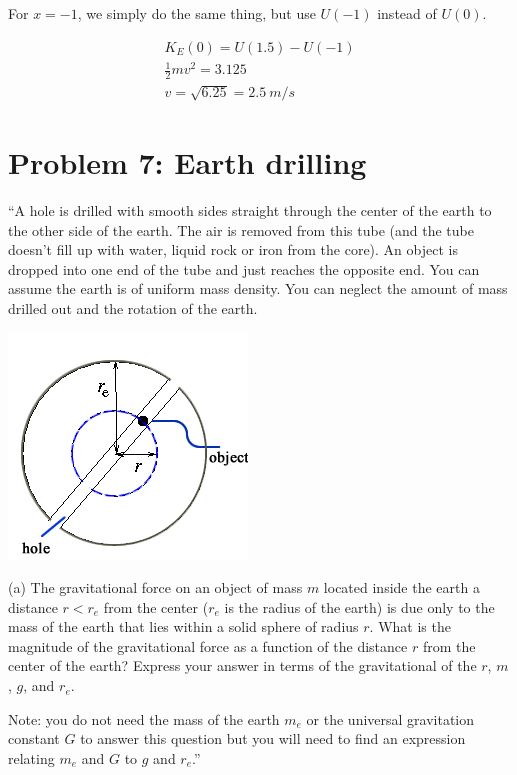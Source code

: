 \documentclass[12pt,a4paper]{report}
\begin{document}
For $x = -1$, we simply do the same thing, but use $U(-1)$ instead of $U(0)$.

\begin{align}
K_E(0) = U(1.5) - U(-1)\\
\frac{1}{2} m v^2 = 3.125\\
v = \sqrt{6.25} = \SI{2.5}{m/s}
\end{align}

\section{Problem 7: Earth drilling}

``A hole is drilled with smooth sides straight through the center of the earth to the other side of the earth. The air is removed from this tube (and the tube doesn't fill up with water, liquid rock or iron from the core). An object is dropped into one end of the tube and just reaches the opposite end. You can assume the earth is of uniform mass density. You can neglect the amount of mass drilled out and the rotation of the earth.

\begin{center}
\includegraphics[scale=0.75]{Graphics/h5p7}
\end{center}

(a) The gravitational force on an object of mass $m$ located inside the earth a distance $r < r_e$ from the center ($r_e$ is the radius of the earth) is due only to the mass of the earth that lies within a solid sphere of radius $r$. What is the magnitude of the gravitational force as a function of the distance $r$ from the center of the earth? Express your answer in terms of the gravitational of the $r$, $m$, $g$, and $r_e$.

Note: you do not need the mass of the earth $m_e$ or the universal gravitation constant $G$ to answer this question but you will need to find an expression relating $m_e$ and $G$ to $g$ and $r_e$.''
\end{document}
